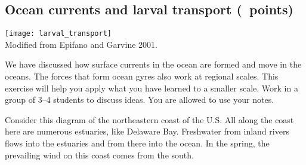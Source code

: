 \documentclass[12pt, addpoints]{exam}
\begin{document}
\subsection*{Ocean currents and larval transport (\numpoints\ points)}

\begin{multicols}{2}

\noindent\texttt{[image: larval\_transport]}\\
{\footnotesize Modified from Epifano and Garvine 2001.}

\columnbreak

We have discussed how surface currents in the ocean are formed and move in the oceans.  The forces that form ocean gyres also work at regional scales. 
This exercise will help you apply what you have learned to a smaller scale.
Work in a group of 3–4 students to discuss ideas. You are allowed 
to use your notes.

Consider this diagram of the northeastern coast of the U.S.  All along the coast here are numerous estuaries, like Delaware Bay. Freshwater from inland rivers flows into the estuaries and from there into the ocean. In the spring, the prevailing wind on this coast comes from the south. 

\end{multicols}
\end{document}
